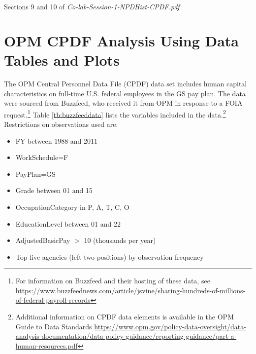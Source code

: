 \documentclass[10pt, letterpaper]{article}
\begin{document}
\begin{spacing}{1.0}
Sections 9 and 10 of \textit{Co-lab-Session-1-NPDHist-CPDF.pdf}


\section{OPM CPDF Analysis Using Data Tables and Plots}\label{sec:DTplot}

The OPM Central Personnel Data File (CPDF) data set includes human capital characteristics on full-time U.S. federal employees in the GS pay plan.  The data were sourced from Buzzfeed, who received it from OPM in response to a FOIA request.\footnote{For information on Buzzfeed and their hosting of these data, see \url{https://www.buzzfeednews.com/article/jsvine/sharing-hundreds-of-millions-of-federal-payroll-records}}  Table \ref{tb:buzzfeeddata} lists the variables included in the data.\footnote{Additional information on CPDF data elements is available in the OPM Guide to Data Standards \url{https://www.opm.gov/policy-data-oversight/data-analysis-documentation/data-policy-guidance/reporting-guidance/part-a-human-resources.pdf}}\\

Restrictions on observations used are:

\begin{itemize}[noitemsep]
    \item FY between 1988 and 2011
    \item WorkSchedule=F
    \item PayPlan=GS
    \item Grade between 01 and 15
    \item OccupationCategory in {P, A, T, C, O}
    \item EducationLevel between 01 and 22
    \item AdjustedBasicPay $>$ 10 (thousands per year)
    \item Top five agencies (left two positions) by observation frequency
\end{itemize}


\end{spacing}
\end{document}
